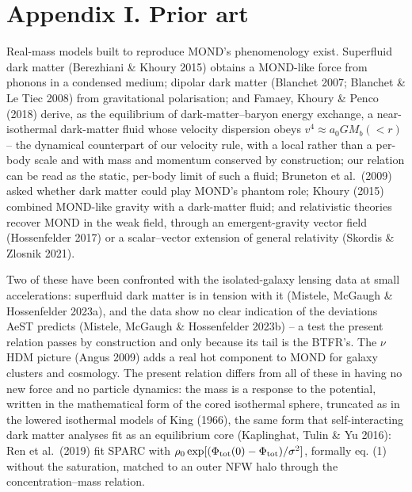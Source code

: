 \documentclass[
  10pt,
]{article}
\begin{document}
\section{Appendix I. Prior art}\label{appendix-i}

Real-mass models built to reproduce MOND's phenomenology exist. Superfluid dark matter (Berezhiani \& Khoury 2015) obtains a MOND-like force from phonons in a condensed medium; dipolar dark matter (Blanchet 2007; Blanchet \& Le Tiec 2008) from gravitational polarisation; and Famaey, Khoury \& Penco (2018) derive, as the equilibrium of dark-matter--baryon energy exchange, a near-isothermal dark-matter fluid whose velocity dispersion obeys $v^4\approx a_0GM_b(<r)$ -- the dynamical counterpart of our velocity rule, with a local rather than a per-body scale and with mass and momentum conserved by construction; our relation can be read as the static, per-body limit of such a fluid; Bruneton et al.~(2009) asked whether dark matter could play MOND's phantom role; Khoury (2015) combined MOND-like gravity with a dark-matter fluid; and relativistic theories recover MOND in the weak field, through an emergent-gravity vector field (Hossenfelder 2017) or a scalar--vector extension of general relativity (Skordis \& Zlosnik 2021).

Two of these have been confronted with the isolated-galaxy lensing data at small accelerations: superfluid dark matter is in tension with it (Mistele, McGaugh \& Hossenfelder 2023a), and the data show no clear indication of the deviations AeST predicts (Mistele, McGaugh \& Hossenfelder 2023b) -- a test the present relation passes by construction and only because its tail is the BTFR's. The $\nu$HDM picture (Angus 2009) adds a real hot component to MOND for galaxy clusters and cosmology. The present relation differs from all of these in having no new force and no particle dynamics: the mass is a response to the potential, written in the mathematical form of the cored isothermal sphere, truncated as in the lowered isothermal models of King (1966), the same form that self-interacting dark matter analyses fit as an equilibrium core (Kaplinghat, Tulin \& Yu 2016): Ren et al.~(2019) fit SPARC with $\rho_0\exp[(\Phi_{\rm tot}(0)-\Phi_{\rm tot})/\sigma^2]$, formally eq. (1) without the saturation, matched to an outer NFW halo through the concentration--mass relation.
\end{document}
